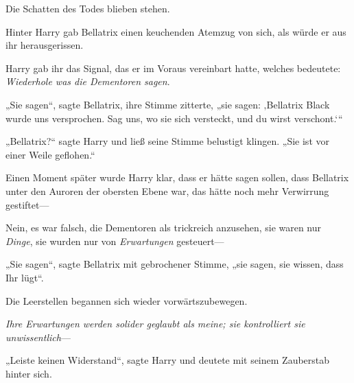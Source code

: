 Die Schatten des Todes blieben stehen.

Hinter Harry gab Bellatrix einen keuchenden Atemzug von sich, als würde er aus ihr herausgerissen.

Harry gab ihr das Signal, das er im Voraus vereinbart hatte, welches bedeutete: \emph{Wiederhole was die Dementoren sagen}.

„Sie sagen“, sagte Bellatrix, ihre Stimme zitterte, „sie sagen: ‚Bellatrix Black wurde uns versprochen. Sag uns, wo sie sich versteckt, und du wirst verschont.‘“

„Bellatrix?“ sagte Harry und ließ seine Stimme belustigt klingen. „Sie ist vor einer Weile geflohen.“

Einen Moment später wurde Harry klar, dass er hätte sagen sollen, dass Bellatrix unter den Auroren der obersten Ebene war, das hätte noch mehr Verwirrung gestiftet—

Nein, es war falsch, die Dementoren als trickreich anzusehen, sie waren nur \emph{Dinge}, sie wurden nur von \emph{Erwartungen} gesteuert—

„Sie sagen“, sagte Bellatrix mit gebrochener Stimme, „sie sagen, sie wissen, dass Ihr lügt“.

Die Leerstellen begannen sich wieder vorwärtszubewegen.

\emph{Ihre Erwartungen werden solider geglaubt als meine; sie kontrolliert sie unwissentlich}—

„Leiste keinen Widerstand“, sagte Harry und deutete mit seinem Zauberstab hinter sich.

